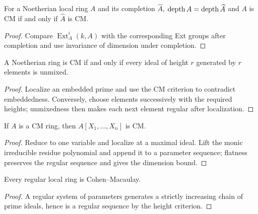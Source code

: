 \begin{theorem}\label{mcrt-thm-17-5}
For a Noetherian local ring $A$ and its completion $\widehat A$,
$\operatorname{depth} A=\operatorname{depth}\widehat A$ and $A$ is CM if and only if $\widehat A$ is CM.
\end{theorem}
\begin{proof}
Compare $\operatorname{Ext}^i_A(k,A)$ with the corresponding Ext groups after
completion and use invariance of dimension under completion.
\end{proof}

\begin{theorem}\label{mcrt-thm-17-6}
A Noetherian ring is CM if and only if every ideal of height $r$ generated by
$r$ elements is unmixed.
\end{theorem}
\begin{proof}
Localize an embedded prime and use the CM criterion to contradict embeddedness.
Conversely, choose elements successively with the required heights; unmixedness
then makes each next element regular after localization.
\end{proof}

\begin{theorem}\label{mcrt-thm-17-7}
If $A$ is a CM ring, then $A[X_1,\ldots,X_n]$ is CM.
\end{theorem}
\begin{proof}
Reduce to one variable and localize at a maximal ideal.  Lift the monic
irreducible residue polynomial and append it to a parameter sequence; flatness
preserves the regular sequence and gives the dimension bound.
\end{proof}

\begin{theorem}\label{mcrt-thm-17-8}
Every regular local ring is Cohen--Macaulay.
\end{theorem}
\begin{proof}
A regular system of parameters generates a strictly increasing chain of prime
ideals, hence is a regular sequence by the height criterion.
\end{proof}

